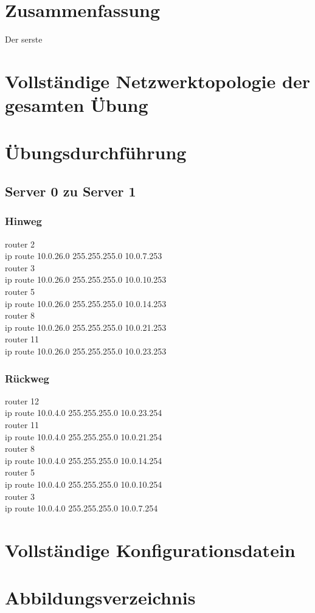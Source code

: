 \documentclass[a4paper]{article}
\begin{document}
\section{Zusammenfassung}
Der serste


\newpage

\section{Vollständige Netzwerktopologie der gesamten Übung}

\newpage

\section{Übungsdurchführung}

\subsection{Server 0 zu Server 1}

\subsubsection{Hinweg}
router 2\\
ip route 10.0.26.0 255.255.255.0 10.0.7.253 \\
router 3\\
ip route 10.0.26.0 255.255.255.0 10.0.10.253\\
router 5\\
ip route 10.0.26.0 255.255.255.0 10.0.14.253\\
router 8\\
ip route 10.0.26.0 255.255.255.0 10.0.21.253\\
router 11\\
ip route 10.0.26.0 255.255.255.0 10.0.23.253\\

\subsubsection{Rückweg}
router 12\\
ip route 10.0.4.0 255.255.255.0 10.0.23.254\\
router 11\\
ip route 10.0.4.0 255.255.255.0 10.0.21.254\\
router 8\\
ip route 10.0.4.0 255.255.255.0 10.0.14.254\\
router 5\\
ip route 10.0.4.0 255.255.255.0 10.0.10.254\\
router 3\\
ip route 10.0.4.0 255.255.255.0 10.0.7.254\\




\newpage

\section{Vollständige Konfigurationsdatein}

\newpage

\section{Abbildungsverzeichnis}

\listoffigures
\end{document}
